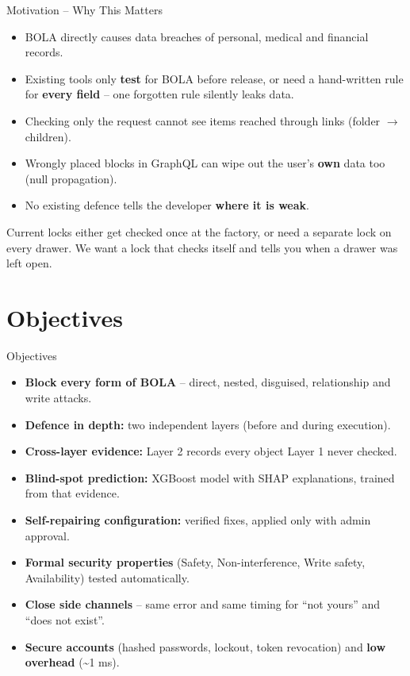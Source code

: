 \documentclass[aspectratio=169,11pt]{beamer}
\begin{document}
\begin{frame}{Motivation – Why This Matters}
\begin{itemize}
\item BOLA directly causes data breaches of personal, medical and financial records.
\item Existing tools only \textbf{test} for BOLA before release, or need a hand-written rule for \textbf{every field} – one forgotten rule silently leaks data.
\item Checking only the request cannot see items reached through links (folder $\rightarrow$ children).
\item Wrongly placed blocks in GraphQL can wipe out the user’s \textbf{own} data too (null propagation).
\item No existing defence tells the developer \textbf{where it is weak}.
\end{itemize}
\vfill
\begin{simplebox}Current locks either get checked once at the factory, or need a separate lock on every drawer. We want a lock that checks itself and tells you when a drawer was left open.\end{simplebox}
\end{frame}

\section{Objectives}
\begin{frame}{Objectives}
\begin{itemize}
\item \textbf{Block every form of BOLA} – direct, nested, disguised, relationship and write attacks.
\item \textbf{Defence in depth:} two independent layers (before and during execution).
\item \textbf{Cross-layer evidence:} Layer 2 records every object Layer 1 never checked.
\item \textbf{Blind-spot prediction:} XGBoost model with SHAP explanations, trained from that evidence.
\item \textbf{Self-repairing configuration:} verified fixes, applied only with admin approval.
\item \textbf{Formal security properties} (Safety, Non-interference, Write safety, Availability) tested automatically.
\item \textbf{Close side channels} – same error and same timing for “not yours” and “does not exist”.
\item \textbf{Secure accounts} (hashed passwords, lockout, token revocation) and \textbf{low overhead} (\textasciitilde{}1 ms).
\end{itemize}
\end{frame}
\end{document}
